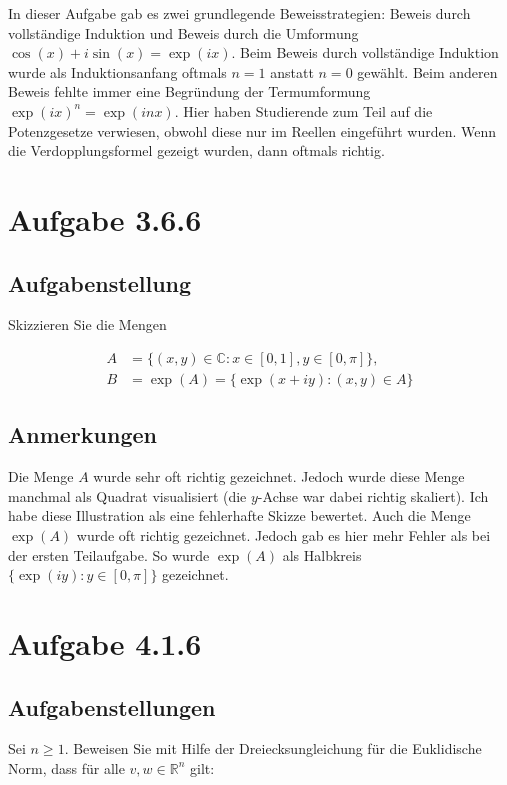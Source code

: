 \documentclass[a4paper]{article}
\newcommand*{\R}{\mathbb R}
\newcommand*{\C}{\mathbb C}
\begin{document}
In dieser Aufgabe gab es zwei grundlegende Beweisstrategien: Beweis durch vollständige Induktion und Beweis durch die Umformung $\cos(x)+i\sin(x) = \exp(ix)$. Beim Beweis durch vollständige Induktion wurde als Induktionsanfang oftmals $n=1$ anstatt $n=0$ gewählt. Beim anderen Beweis fehlte immer eine Begründung der Termumformung $\exp(ix)^n = \exp(inx)$. Hier haben Studierende zum Teil auf die Potenzgesetze verwiesen, obwohl diese nur im Reellen eingeführt wurden. Wenn die Verdopplungsformel gezeigt wurden, dann oftmals richtig.

\section{Aufgabe 3.6.6}

\subsection{Aufgabenstellung}

Skizzieren Sie die Mengen

\begin{align}
  A &= \{(x,y)\in\C : x\in[0,1],y\in[0,\pi] \}, \\
  B &= \exp(A) = \{ \exp(x+iy) : (x,y) \in A \}
\end{align}

\subsection{Anmerkungen}

Die Menge $A$ wurde sehr oft richtig gezeichnet. Jedoch wurde diese Menge manchmal als Quadrat visualisiert (die $y$-Achse war dabei richtig skaliert). Ich habe diese Illustration als eine fehlerhafte Skizze bewertet. Auch die Menge $\exp(A)$ wurde oft richtig gezeichnet. Jedoch gab es hier mehr Fehler als bei der ersten Teilaufgabe. So wurde $\exp(A)$ als Halbkreis $\{ \exp(iy) : y\in[0,\pi] \}$ gezeichnet.

\section{Aufgabe 4.1.6}

\subsection{Aufgabenstellungen}

Sei $n\ge 1$. Beweisen Sie mit Hilfe der Dreiecksungleichung für die Euklidische Norm, dass für alle $v,w\in\R^n$ gilt:
\end{document}
